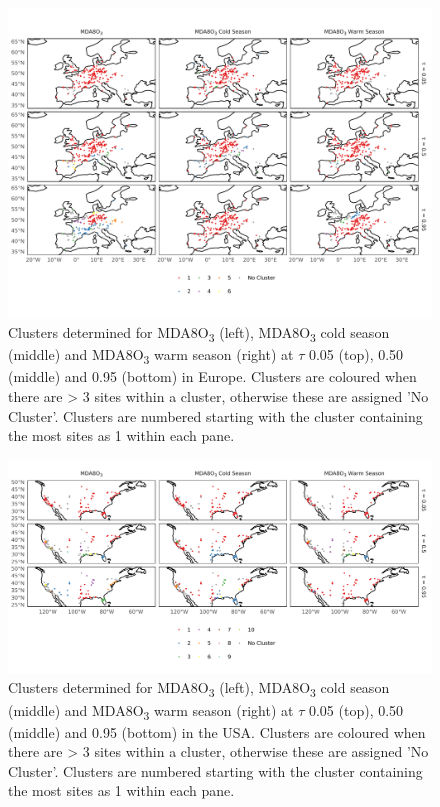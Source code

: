 \documentclass[journal abbreviation, manuscript]{copernicus}
\begin{document}
\begin{figure}
    \centering
    \includegraphics[width=\textwidth]{figures/paper_figures/f07_eu_clusters.pdf}
    \caption{Clusters determined for MDA8O\textsubscript{3} (left), MDA8O\textsubscript{3} cold season (middle) and MDA8O\textsubscript{3} warm season (right) at $\tau$ 0.05 (top), 0.50 (middle) and 0.95 (bottom) in Europe. Clusters are coloured when there are > 3 sites within a cluster, otherwise these are assigned 'No Cluster'. Clusters are numbered starting with the cluster containing the most sites as 1 within each pane.}
    \label{fig:eu_cluster}
\end{figure}

\clearpage

\begin{figure}
    \centering
    \includegraphics[width=\textwidth]{figures/paper_figures/f08_us_clusters.pdf}
    \caption{Clusters determined for MDA8O\textsubscript{3} (left), MDA8O\textsubscript{3} cold season (middle) and MDA8O\textsubscript{3} warm season (right) at $\tau$ 0.05 (top), 0.50 (middle) and 0.95 (bottom) in the USA. Clusters are coloured when there are > 3 sites within a cluster, otherwise these are assigned 'No Cluster'. Clusters are numbered starting with the cluster containing the most sites as 1 within each pane.}
    \label{fig:us_cluster}
\end{figure}
\end{document}
